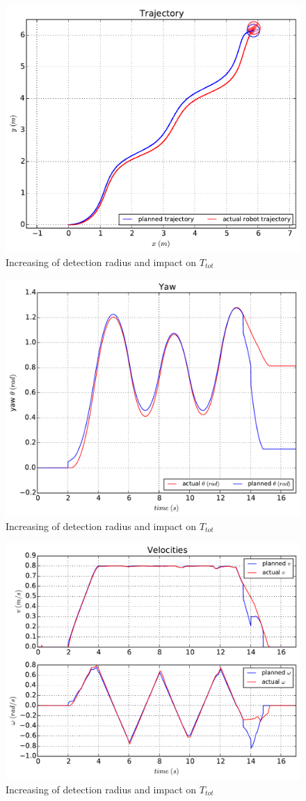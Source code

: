 \begin{figure}[!h]\centering
  \includegraphics[width=.48\textwidth]{./images/xde/dy_path.pdf}
  \caption{Increasing of detection radius and impact on
  $T_{tot}$\label{fig:xdepath}}
\end{figure}
\begin{figure}[!h]\centering
  \includegraphics[width=.48\textwidth]{./images/xde/ang.pdf}
  \caption{Increasing of detection radius and impact on
  $T_{tot}$\label{fig:xdeang}}
\end{figure}
\begin{figure}[!h]\centering
  \includegraphics[width=.52\textwidth]{./images/xde/dy_vw.pdf}
  \caption{Increasing of detection radius and impact on
  $T_{tot}$\label{fig:xdevelo}}
\end{figure}

